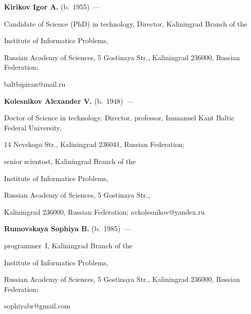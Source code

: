  \label{end\stat}





\Contr





\noindent


\textbf{Kirikov Igor A.} (b.\ 1955)~---


Candidate of Science (PhD) in technology, Director, Kaliningrad Branch of the


Institute of Informatics Problems,


Russian Academy of Sciences, 5 Gostinaya Str., Kaliningrad 236000, Russian Federation;


baltbipiran@mail.ru





\vspace*{3pt}





\noindent


\textbf{Kolesnikov Alexander V.} (b.\ 1948)~---


Doctor of Science in technology, Director, professor, Immanuel Kant Baltic Federal University,


14 Nevskogo Str., Kaliningrad 236041, Russian Federation;


senior scientost, Kaliningrad Branch of the


Institute of Informatics Problems,


Russian Academy of Sciences, 5 Gostinaya Str.,


Kaliningrad 236000, Russian Federation; avkolesnikov@yandex.ru





\vspace*{3pt}





\noindent


\textbf{Rumovskaya Sophiya B.} (b.\ 1985)~---


programmer~I, Kaliningrad Branch of the


Institute of Informatics Problems,


Russian Academy of Sciences, 5 Gostinaya Str., Kaliningrad 236000, Russian Federation;


sophiyabr@gmail.com








\renewcommand{\bibname}{\protect\rmfamily Литература}


